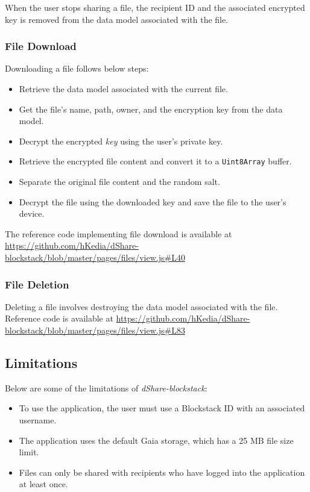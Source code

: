 When the user stops sharing a file, the recipient ID and the associated encrypted key is removed from the data model associated with the file.

\subsubsection{File Download}
Downloading a file follows below steps:

\begin{itemize}
	\item Retrieve the data model associated with the current file.
	\item Get the file's name, path, owner, and the encryption key from the data model.
	\item Decrypt the encrypted \textit{key} using the user's private key.
	\item Retrieve the encrypted file content and convert it to a \texttt{Uint8Array} buffer.
	\item Separate the original file content and the random salt.
	\item Decrypt the file using the downloaded key and save the file to the user's device.
\end{itemize}

The reference code implementing file download is available at \url{https://github.com/hKedia/dShare-blockstack/blob/master/pages/files/view.js#L40}

\subsubsection{File Deletion}
Deleting a file involves destroying the data model associated with the file. Reference code is available at \url{https://github.com/hKedia/dShare-blockstack/blob/master/pages/files/view.js#L83}

\subsection{Limitations}
Below are some of the limitations of \textit{dShare-blockstack}:

\begin{itemize}
	\item To use the application, the user must use a Blockstack ID with an associated username.
	\item The application uses the default Gaia storage, which has a 25 MB file size limit.
	\item Files can only be shared with recipients who have logged into the application at least once.
\end{itemize}

